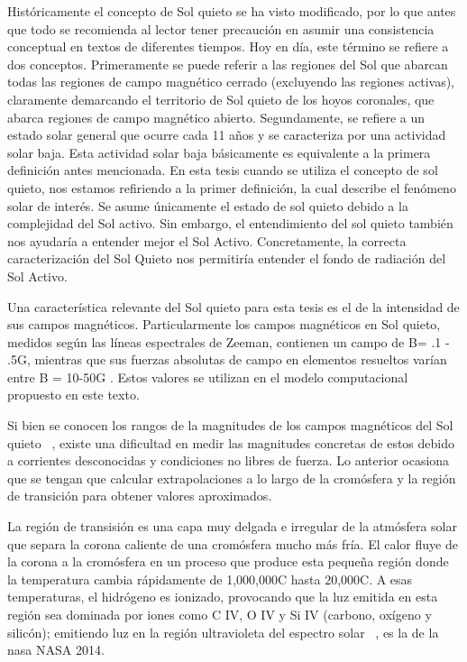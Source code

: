 Hist\'oricamente el concepto de Sol quieto se ha visto modificado, por lo que antes que todo se recomienda al lector tener precauci\'on en asumir una consistencia conceptual en textos de diferentes tiempos. Hoy en d\'ia, este t\'ermino se refiere a dos conceptos. Primeramente se puede referir a las regiones del Sol que abarcan todas las regiones de campo magn\'etico cerrado (excluyendo las regiones activas), claramente demarcando el territorio de Sol quieto de los hoyos coronales, que abarca regiones de campo magn\'etico abierto.
Segundamente, se refiere a un estado solar general que ocurre cada 11 a\~nos y se caracteriza por una actividad solar baja. Esta actividad solar baja b\'asicamente es equivalente a la primera definici\'on antes mencionada. En esta tesis cuando se utiliza el concepto de sol quieto, nos estamos refiriendo a la primer definici\'on, la cual describe el fen\'omeno solar de inter\'es. Se asume \'unicamente el estado de sol quieto debido a la complejidad del Sol activo. Sin embargo, el entendimiento del sol quieto tambi\'en nos ayudar\'ia a entender mejor el Sol Activo. Concretamente, la correcta caracterizaci\'on del Sol Quieto nos permitir\'ia entender el fondo de radiaci\'on del Sol Activo.

Una caracter\'istica relevante del Sol quieto para esta tesis es el de la intensidad de sus campos magn\'eticos. Particularmente los campos magn\'eticos en Sol quieto, medidos seg\'un las l\'ineas espectrales de Zeeman, contienen un campo de B= .1 - .5G, mientras que sus fuerzas absolutas de campo en elementos resueltos var\'ian entre B = 10-50G \citep{1000G}. Estos valores se utilizan en el modelo computacional propuesto en este texto.

Si bien se conocen los rangos de la magnitudes de los campos magn\'eticos del Sol quieto ~\citep{VAULT2}, existe una dificultad en medir las magnitudes concretas de estos debido a corrientes desconocidas y condiciones no libres de fuerza. Lo anterior ocasiona que se tengan que calcular extrapolaciones a lo largo de la crom\'osfera y la regi\'on de transici\'on para obtener valores aproximados. 

La región de transisión es una capa muy delgada e irregular de la atmósfera solar que separa la corona caliente de una cromósfera mucho más fría. El calor fluye de la corona a la cromósfera en un proceso que produce esta pequeña regi\'on donde la temperatura cambia rápidamente de 1,000,000C hasta 20,000C. A esas temperaturas, el hidrógeno es ionizado, provocando que la luz emitida en esta región sea dominada por iones como C IV, O IV y Si IV (carbono, oxígeno y silicón); emitiendo luz en la región ultravioleta del espectro solar ~\citep{NASAtr}, es la de la nasa NASA 2014.


